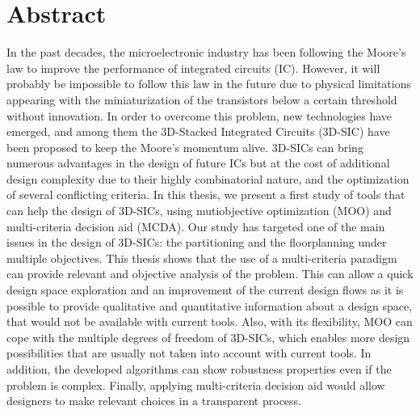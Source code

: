 \chapter{Abstract}

In the past decades, the microelectronic industry has been following the Moore's law to improve the performance of integrated circuits (IC). However, it will probably be impossible to follow this law in the future due to physical limitations appearing with the miniaturization of the transistors below a certain threshold without innovation. In order to overcome this problem, new technologies have emerged, and among them the 3D-Stacked Integrated Circuits (3D-SIC) have been proposed to keep the Moore's momentum alive. 3D-SICs can bring numerous advantages in the design of future ICs but at the cost of additional design complexity due to their highly combinatorial nature, and the optimization of several conflicting criteria. In this thesis, we present a first study of tools that can help the design of 3D-SICs, using mutiobjective optimization (MOO) and multi-criteria decision aid (MCDA). Our study has targeted one of the main issues in the design of 3D-SICs: the partitioning and the floorplanning under multiple objectives. This thesis shows that the use of a multi-criteria paradigm can provide relevant and objective analysis of the problem. This can allow a quick design space exploration and an improvement of the current design flows as it is possible to provide qualitative and quantitative information about a design space, that would not be available with current tools. Also, with its flexibility, MOO can cope with the multiple degrees of freedom of 3D-SICs, which enables more design possibilities that are usually not taken into account with current tools. In addition, the developed algorithms can show robustness properties even if the problem is complex. Finally, applying multi-criteria decision aid would allow designers to make relevant choices in a transparent process.